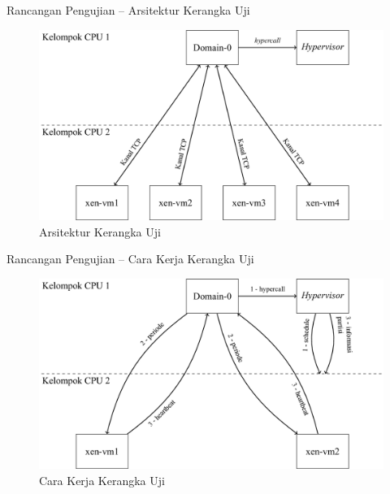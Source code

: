 \documentclass[xetex]{beamer}
\begin{document}
\begin{frame}{Rancangan Pengujian -- Arsitektur Kerangka Uji}
	\centering
	\begin{figure}
		\includegraphics[scale=0.20]{./final-project-figure4.png}
		\caption{Arsitektur Kerangka Uji}
	\end{figure}
\end{frame}
\begin{frame}{Rancangan Pengujian -- Cara Kerja Kerangka Uji}
	\centering
	\begin{figure}
		\includegraphics[scale=0.20]{./final-project-figure5.png}
		\caption{Cara Kerja Kerangka Uji}
	\end{figure}
\end{frame}
\end{document}
